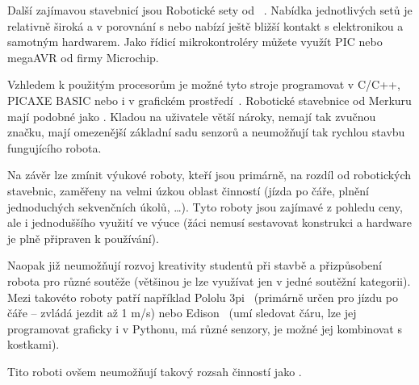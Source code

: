 
Další zajímavou stavebnicí jsou Robotické sety od ~\cite{merkur_roboticsSetsEshop}. 
Nabídka jednotlivých setů je relativně široká a v porovnání s \legoM{ }nebo \fischerT{ }nabízí ještě bližší kontakt s elektronikou a samotným hardwarem. 
Jako řídicí mikrokontroléry můžete využít PIC nebo megaAVR od firmy Microchip. 

Vzhledem k použitým procesorům je možné tyto stroje programovat v C/C++, PICAXE BASIC nebo i v grafickém prostředí~\cite{picaxeCz_BlocklyForPICAXE}. 
Robotické stavebnice od Merkuru mají podobné  jako \fischerT. 
Kladou na uživatele větší nároky, nemají tak zvučnou značku, mají omezenější základní sadu senzorů a neumožňují tak rychlou stavbu fungujícího robota.

Na závěr lze zmínit výukové roboty, kteří jsou primárně, na rozdíl od robotických stavebnic, zaměřeny na velmi úzkou oblast činností (jízda po čáře, plnění jednoduchých sekvenčních úkolů, \dots). 
Tyto roboty jsou zajímavé z pohledu ceny, ale i jednoduššího využití ve výuce (žáci nemusí sestavovat konstrukci a hardware je plně připraven k používání). 

Naopak již neumožňují rozvoj kreativity studentů při stavbě a přizpůsobení robota pro různé soutěže (většinou je lze využívat jen v jedné soutěžní kategorii).  
Mezi takovéto roboty patří například Pololu 3pi~\cite{robotPololu3pi} (primárně určen pro jízdu po čáře -- zvládá jezdit až 1 m/s) nebo Edison~\cite{robotEdison} (umí sledovat čáru, lze jej programovat graficky i v Pythonu, má různé senzory, je možné jej kombinovat s \lego{ }kostkami). 

Tito roboti ovšem neumožňují takový rozsah činností jako \legoM.


